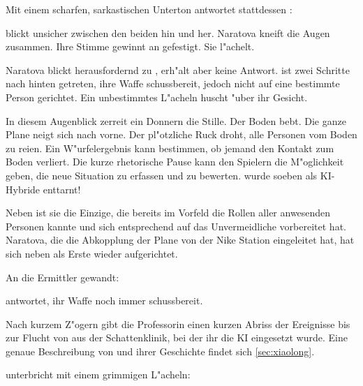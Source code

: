 Mit einem scharfen, sarkastischen Unterton antwortet stattdessen \xl{}:


\ml{} blickt unsicher zwischen den beiden hin und her. Naratova kneift die Augen zusammen. Ihre Stimme gewinnt an gefestigt. Sie l"achelt.


Naratova blickt herausfordernd zu \xl{}, erh"alt aber keine Antwort. \xl{} ist zwei Schritte nach hinten getreten, ihre Waffe schussbereit, jedoch nicht auf eine bestimmte Person gerichtet. Ein unbestimmtes L"acheln huscht "uber ihr Gesicht.

In diesem Augenblick zerrei\3t ein Donnern die Stille. Der Boden bebt. Die ganze Plane neigt sich nach vorne. Der pl"otzliche Ruck droht, alle Personen vom Boden zu rei\3en. Ein W"urfelergebnis kann bestimmen, ob jemand den Kontakt zum Boden verliert. Die kurze rhetorische Pause kann den Spielern die M"oglichkeit geben, die neue Situation zu erfassen und zu bewerten. \xl{} wurde soeben als KI-Hybride enttarnt!

Neben \ml{} ist sie die Einzige, die bereits im Vorfeld die Rollen aller anwesenden Personen kannte und sich entsprechend auf das Unvermeidliche vorbereitet hat. Naratova, die die Abkopplung der Plane von der Nike Station eingeleitet hat, hat sich neben \xl{} als Erste wieder aufgerichtet. 

An die Ermittler gewandt:


\xl{} antwortet, ihr Waffe noch immer schussbereit.


Nach kurzem Z"ogern gibt die Professorin einen kurzen Abriss der Ereignisse bis zur Flucht von \xl{} aus der Schattenklinik, bei der ihr die KI eingesetzt wurde. Eine genaue Beschreibung von \xl{} und ihrer Geschichte findet sich \cref{sec:xiaolong}.

\xl{} unterbricht mit einem grimmigen L"acheln:


